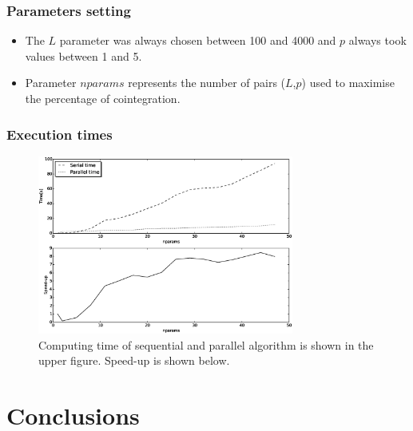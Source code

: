\documentclass[compress,red]{beamer}
\begin{document}
\begin{frame}
\frametitle{Parameters setting}
\begin{itemize}
\item The $L$ parameter was always chosen between 100 and 4000 and $p$ always took values
between 1 and 5. 
\item Parameter $nparams$ represents the number of pairs ($L$,$p$) used to maximise the percentage of cointegration. 
\end{itemize}
\end{frame}

\begin{frame}
\frametitle{Execution times}
\begin{figure}[ht]
  \centering
  \includegraphics[width=0.75\textwidth]{img/extimes}
  \caption{Computing time of sequential and parallel algorithm is shown in the
  upper figure. Speed-up is shown below.}
  \label{fig:extimes}
\end{figure}

\end{frame}

\section{Conclusions}
\end{document}
